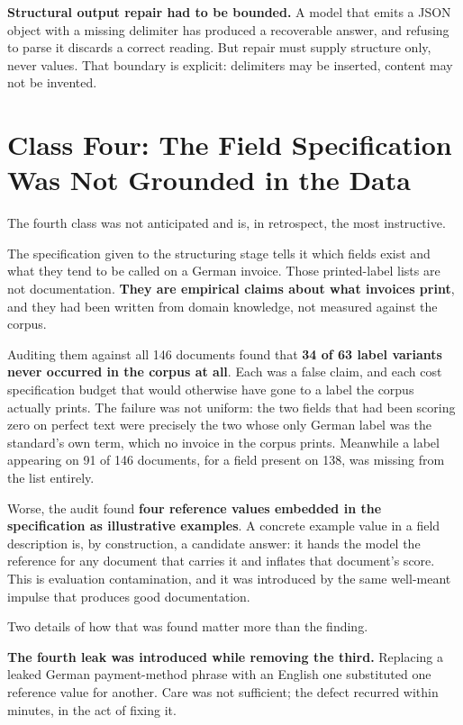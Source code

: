 \textbf{Structural output repair had to be bounded.} A model that emits a \ac{JSON} object with
a missing delimiter has produced a recoverable answer, and refusing to parse it discards a
correct reading. But repair must supply structure only, never values. That boundary is
explicit: delimiters may be inserted, content may not be invented.

\section{Class Four: The Field Specification Was Not Grounded in the Data}
\label{sec:validity-specification}

The fourth class was not anticipated and is, in retrospect, the most instructive.

The specification given to the structuring stage tells it which fields exist and what they tend
to be called on a German invoice. Those printed-label lists are not documentation. \textbf{They
are empirical claims about what invoices print}, and they had been written from domain
knowledge, not measured against the corpus.

Auditing them against all 146 documents found that \textbf{34 of 63 label variants never
occurred in the corpus at all}. Each was a false claim, and each cost specification budget that
would otherwise have gone to a label the corpus actually prints. The failure was not uniform:
the two fields that had been scoring zero on perfect text were precisely the two whose only
German label was the standard's own term, which no invoice in the corpus prints. Meanwhile a
label appearing on 91 of 146 documents, for a field present on 138, was missing from the list
entirely.

Worse, the audit found \textbf{four reference values embedded in the specification as
illustrative examples}. A concrete example value in a field description is, by construction, a
candidate answer: it hands the model the reference for any document that carries it and
inflates that document's score. This is evaluation contamination, and it was introduced by the
same well-meant impulse that produces good documentation.

Two details of how that was found matter more than the finding.

\textbf{The fourth leak was introduced while removing the third.} Replacing a leaked German
payment-method phrase with an English one substituted one reference value for another. Care was
not sufficient; the defect recurred within minutes, in the act of fixing it.

